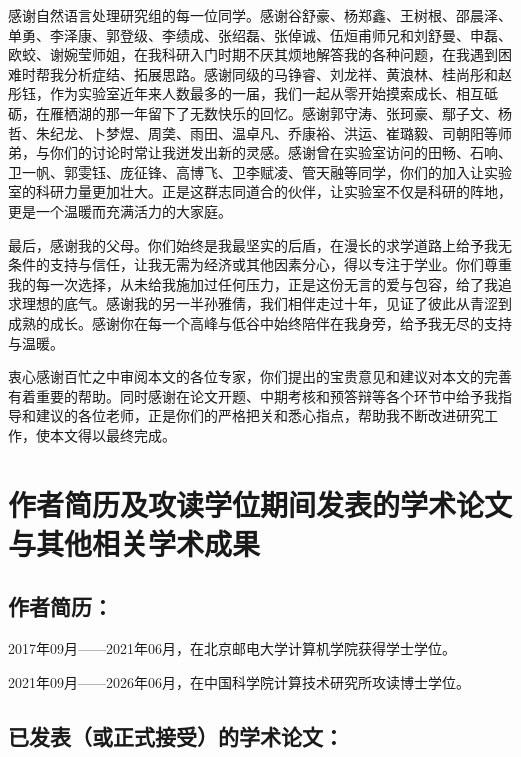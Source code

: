 感谢自然语言处理研究组的每一位同学。感谢谷舒豪、杨郑鑫、王树根、邵晨泽、单勇、李泽康、郭登级、李绩成、张绍磊、张倬诚、伍{烜}甫师兄和刘舒曼、申磊、欧蛟、谢婉莹师姐，在我科研入门时期不厌其烦地解答我的各种问题，在我遇到困难时帮我分析症结、拓展思路。感谢同级的马铮睿、刘龙祥、黄浪林、桂尚彤和赵彤钰，作为实验室近年来人数最多的一届，我们一起从零开始摸索成长、相互砥砺，在雁栖湖的那一年留下了无数快乐的回忆。感谢郭守涛、张珂豪、鄢子文、杨哲、朱纪龙、卜梦煜、周\texorpdfstring{{䶮}}{yan}、雨田、温卓凡、乔康裕、洪运、崔璐毅、司朝阳等师弟，与你们的讨论时常让我迸发出新的灵感。感谢曾在实验室访问的田畅、石响、卫一帆、郭雯钰、庞征锋、高博飞、卫李赋凌、管天融等同学，你们的加入让实验室的科研力量更加壮大。正是这群志同道合的伙伴，让实验室不仅是科研的阵地，更是一个温暖而充满活力的大家庭。

最后，感谢我的父母。你们始终是我最坚实的后盾，在漫长的求学道路上给予我无条件的支持与信任，让我无需为经济或其他因素分心，得以专注于学业。你们尊重我的每一次选择，从未给我施加过任何压力，正是这份无言的爱与包容，给了我追求理想的底气。感谢我的另一半孙雅倩，我们相伴走过十年，见证了彼此从青涩到成熟的成长。感谢你在每一个高峰与低谷中始终陪伴在我身旁，给予我无尽的支持与温暖。

衷心感谢百忙之中审阅本文的各位专家，你们提出的宝贵意见和建议对本文的完善有着重要的帮助。同时感谢在论文开题、中期考核和预答辩等各个环节中给予我指导和建议的各位老师，正是你们的严格把关和悉心指点，帮助我不断改进研究工作，使本文得以最终完成。

\chapter{作者简历及攻读学位期间发表的学术论文与其他相关学术成果}

\section*{作者简历：}
2017年09月——2021年06月，在北京邮电大学计算机学院获得学士学位。

2021年09月——2026年06月，在中国科学院计算技术研究所攻读博士学位。


\section*{已发表（或正式接受）的学术论文：}

